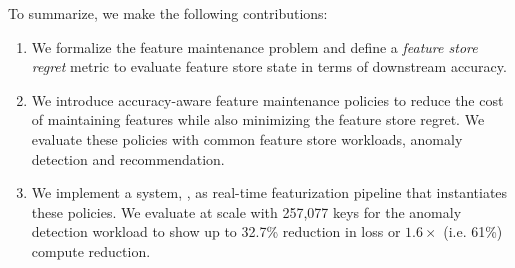 

To summarize, we make the following contributions:
\begin{enumerate}
    \item We formalize the feature maintenance problem and define a \textit{feature store regret} metric to evaluate feature store state in terms of downstream accuracy. 
    \item We introduce accuracy-aware feature maintenance policies to reduce the cost of maintaining features while also minimizing the feature store regret. We evaluate these policies with common feature store workloads, anomaly detection and recommendation. 
    \item We implement a system, \system{}, as real-time featurization pipeline that instantiates these policies. We evaluate \system{} at scale with 257,077 keys for the anomaly detection workload to show up to 32.7\% reduction in loss or $1.6\times$ (i.e. 61\%) compute reduction.

\end{enumerate}


